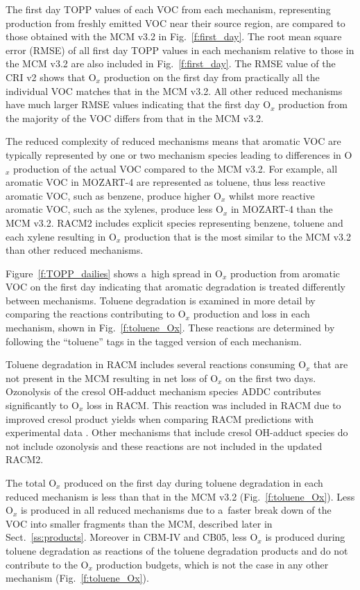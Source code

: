 \documentclass[acpd, online, hvmath]{copernicus}
\begin{document}
The first day TOPP values of each VOC from each mechanism,
representing  production from freshly emitted VOC near their
source region, are compared to those obtained with the MCM v3.{2} in
Fig.~\ref{f:first_day}.  The root mean square error (RMSE) of all
first day TOPP values in each mechanism relative to those in the MCM
v3.2 are also included in Fig.~\ref{f:first_day}.  The RMSE value of
the CRI v2 shows that O$_{x}$ production on the first day from
practically all the individual VOC matches that in the MCM v3.2.  All
other reduced mechanisms have much larger RMSE values indicating that
the first day O$_{x}$ production from the majority of the VOC
differs from that in the MCM v3.2.

The reduced complexity of reduced mechanisms means that aromatic VOC
are typically represented by one or two mechanism species leading to
differences in O$_{x}$ production of the actual VOC compared to the
MCM v3.2.  For example, all aromatic VOC in MOZART-4 are represented
as toluene, thus less reactive aromatic VOC, such as benzene, produce
higher O$_{x}$ whilst more reactive aromatic VOC, such as the
xylenes, produce less O$_{x}$ in MOZART-4 than the MCM v3.2.  RACM2
includes explicit species representing benzene, toluene and each
xylene resulting in O$_{x}$ production that is the most similar to
the MCM v3.2 than other reduced mechanisms.

Figure~\ref{f:TOPP_dailies} shows a~high spread in O$_{x}$
production from aromatic VOC on the first day indicating that aromatic
degradation is treated differently between mechanisms.  Toluene
degradation is examined in more detail by comparing the reactions
contributing to O$_{x}$ production and loss in each mechanism,
shown in Fig.~\ref{f:toluene_Ox}.  These reactions are determined by
following the ``toluene'' tags in the tagged version of each
mechanism.

Toluene degradation in RACM includes several reactions consuming
O$_{x}$ that are not present in the MCM resulting in net loss of
O$_{x}$ on the first two days.  Ozonolysis of the cresol OH-adduct
mechanism species ADDC contributes significantly to O$_{x}$ loss in
RACM.  This reaction was included in RACM due to improved cresol
product yields when comparing RACM predictions with experimental data
\citep{Stockwell:1997}.  Other mechanisms that include cresol
OH-adduct species do not include ozonolysis and these reactions are
not included in the updated RACM2.

The total O$_{x}$ produced on the first day during toluene
degradation in each reduced mechanism is less than that in the MCM
v3.2 (Fig.~\ref{f:toluene_Ox}).  Less O$_{x}$ is produced in all
reduced mechanisms due to a~faster break down of the VOC into smaller
fragments than the MCM, described later in Sect.~\ref{ss:products}.
Moreover in CBM-IV and CB05, less O$_{x}$ is produced during
toluene degradation as reactions of the toluene degradation products
 and  do not contribute to the O$_{x}$
production budgets, which is not the case in any other mechanism
(Fig.~\ref{f:toluene_Ox}).
\end{document}
